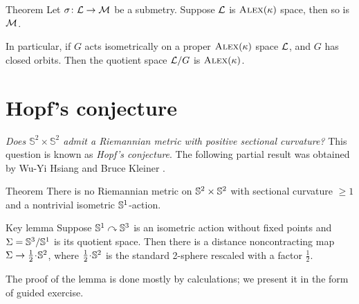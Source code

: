 \begin{thm}{Theorem}\label{thm:submetry-CBB-1}
Let $\sigma\colon\mathcal{L}\to\mathcal{M}$ be a submetry.
Suppose $\mathcal{L}$ is $\textsc{Alex}(\kappa)$ space, then so is $\mathcal{M}$.

In particular, if $G$ acts isometrically on a proper $\textsc{Alex}(\kappa)$ space $\mathcal{L}$, and $G$ has closed orbits.
Then the quotient space $\mathcal{L}/G$ is $\textsc{Alex}(\kappa)$.
\end{thm}

\section{Hopf's conjecture}

\textit{Does $\mathbb{S}^2\times\mathbb{S}^2$ admit a Riemannian metric with positive sectional curvature?}
This question is known as \emph{Hopf's conjecture}.
The following partial result was obtained by Wu-Yi Hsiang and Bruce Kleiner \cite{hsiang-kleiner}.

\begin{thm}{Theorem}\label{thm:hsiang-kleiner}
There is no Riemannian metric on $\mathbb{S}^2\times\mathbb{S}^2$ with sectional curvature $\ge 1$ and a nontrivial isometric $\mathbb{S}^1$-action.
\end{thm}


\begin{thm}{Key lemma}\label{lem:S^3/S^1}
Suppose $\mathbb{S}^1\curvearrowright\mathbb{S}^3$ is an isometric action without fixed points 
and $\Sigma=\mathbb{S}^3/\mathbb{S}^1$ is its quotient space.
Then there is a distance noncontracting map $\Sigma\to \tfrac12\cdot \SSS^2$, where $\tfrac12\cdot \SSS^2$ is the standard 2-sphere rescaled with a factor $\tfrac12$.
\end{thm}

The proof of the lemma is done mostly by calculations;
we present it in the form of guided exercise.

